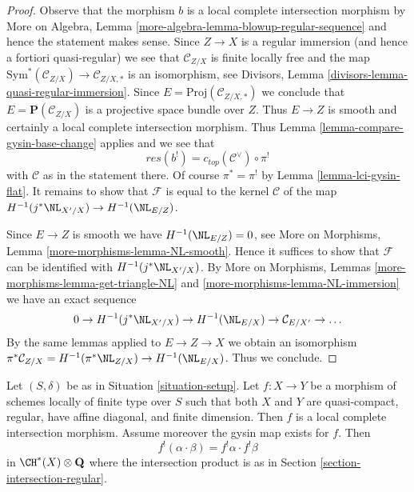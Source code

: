 \begin{proof}
Observe that the morphism $b$ is a local complete intersection morphism
by More on Algebra, Lemma \ref{more-algebra-lemma-blowup-regular-sequence}
and hence the statement makes sense. Since $Z \to X$ is a regular
immersion (and hence a fortiori quasi-regular) we see that $\mathcal{C}_{Z/X}$
is finite locally free and the map
$\text{Sym}^*(\mathcal{C}_{Z/X}) \to \mathcal{C}_{Z/X, *}$
is an isomorphism, see
Divisors, Lemma \ref{divisors-lemma-quasi-regular-immersion}.
Since $E = \text{Proj}(\mathcal{C}_{Z/X, *})$ we conclude
that $E = \mathbf{P}(\mathcal{C}_{Z/X})$
is a projective space bundle over $Z$.
Thus $E \to Z$ is smooth and certainly a local complete intersection
morphism. Thus Lemma \ref{lemma-compare-gysin-base-change}
applies and we see that
$$
res(b^!) = c_{top}(\mathcal{C}^\vee) \circ \pi^!
$$
with $\mathcal{C}$ as in the statement there.
Of course $\pi^* = \pi^!$ by Lemma \ref{lemma-lci-gysin-flat}.
It remains to show that $\mathcal{F}$ is equal to
the kernel $\mathcal{C}$ of the map
$H^{-1}(j^*\NL_{X'/X}) \to H^{-1}(\NL_{E/Z})$.

\medskip\noindent
Since $E \to Z$ is smooth we have $H^{-1}(\NL_{E/Z}) = 0$, see
More on Morphisms, Lemma \ref{more-morphisms-lemma-NL-smooth}.
Hence it suffices to show that $\mathcal{F}$ can be identified
with $H^{-1}(j^*\NL_{X'/X})$. By More on Morphisms, Lemmas
\ref{more-morphisms-lemma-get-triangle-NL} and
\ref{more-morphisms-lemma-NL-immersion} we have an exact sequence
$$
0 \to H^{-1}(j^*\NL_{X'/X}) \to H^{-1}(\NL_{E/X}) \to
\mathcal{C}_{E/X'} \to \ldots
$$
By the same lemmas applied to $E \to Z \to X$ we obtain an isomorphism
$\pi^*\mathcal{C}_{Z/X} = H^{-1}(\pi^*\NL_{Z/X}) \to H^{-1}(\NL_{E/X})$.
Thus we conclude.
\end{proof}

\begin{lemma}
\label{lemma-lci-gysin-product-regular}
Let $(S, \delta)$ be as in Situation \ref{situation-setup}.
Let $f : X \to Y$ be a morphism of schemes locally of finite
type over $S$ such that both $X$ and $Y$ are quasi-compact,
regular, have affine diagonal, and finite dimension.
Then $f$ is a local complete intersection morphism.
Assume moreover the gysin map exists for $f$. Then
$$
f^!(\alpha \cdot \beta) = f^!\alpha \cdot f^!\beta
$$
in $\CH^*(X) \otimes \mathbf{Q}$ where the intersection product
is as in Section \ref{section-intersection-regular}.
\end{lemma}

